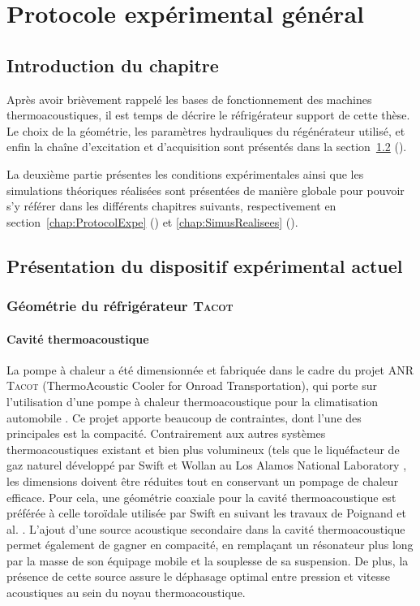\chapter{Protocole expérimental général}
\mylocaltoc


\section{Introduction du chapitre}\label{chap:IntroProtocExp}
Après avoir brièvement rappelé les bases de fonctionnement des machines thermoacoustiques, il est temps de décrire le réfrigérateur support de cette thèse. Le choix de la géométrie, les paramètres hydrauliques du régénérateur utilisé, et enfin la chaîne d'excitation et d'acquisition sont présentés dans la section~\ref{chap:PresentationTacot} ().

La deuxième partie présentes les conditions expérimentales ainsi que les simulations théoriques réalisées sont présentées de manière globale pour pouvoir s'y référer dans les différents chapitres suivants, respectivement en section~\ref{chap:ProtocolExpe} () et \ref{chap:SimusRealisees} ().

\section{Présentation du dispositif expérimental actuel}\label{chap:PresentationTacot}
\subsection{Géométrie du réfrigérateur \textsc{Tacot}}
\subsubsection{Cavité thermoacoustique}
La pompe à chaleur a été dimensionnée et fabriquée dans le cadre du projet ANR \textsc{Tacot} (ThermoAcoustic Cooler for Onroad Transportation), qui porte sur l'utilisation d'une pompe à chaleur thermoacoustique pour la climatisation automobile \cite{ANR_thermo-acoustic_2019}. Ce projet apporte beaucoup de contraintes, dont l'une des principales est la compacité. Contrairement aux autres systèmes thermoacoustiques existant et bien plus volumineux (tels que le liquéfacteur de gaz naturel développé par Swift et Wollan au Los Alamos National Laboratory \cite{swift_thermoacoustics_2002, wollan_development_2002} , les dimensions doivent être réduites tout en conservant un pompage de chaleur efficace. Pour cela, une géométrie coaxiale pour la cavité thermoacoustique est préférée à celle toroïdale utilisée par Swift en suivant les travaux de Poignand et al. \cite{poignand_thermoacoustic_2011,poignand_analysis_2013}. L'ajout d'une source acoustique secondaire dans la cavité thermoacoustique permet également de gagner en compacité, en remplaçant un résonateur plus long par la masse de son équipage mobile et la souplesse de sa suspension. De plus, la présence de cette source assure le déphasage optimal entre pression et vitesse acoustiques au sein du noyau thermoacoustique.%


